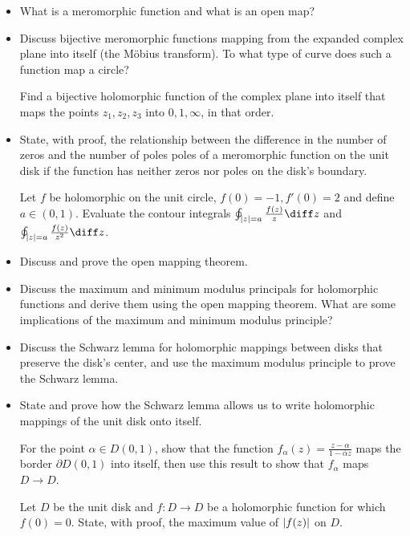 \begin{itemize}

	\item What is a meromorphic function and what is an open map?

	\item Discuss bijective meromorphic functions mapping from the expanded complex plane into itself (the M\"{o}bius transform). To what type of curve does such a function map a circle?
	
	Find a bijective holomorphic function of the complex plane into itself that maps the points $ z_1, z_{2}, z_{3} $ into $ 0, 1, \infty $, in that order.
	

	\item State, with proof, the relationship between the difference in the number of zeros and the number of poles poles of a meromorphic function on the unit disk if the function has neither zeros nor poles on the disk's boundary.
		
	Let $ f $ be holomorphic on the unit circle, $ f(0) = -1, f'(0) = 2 $ and define $ a \in (0, 1) $. Evaluate the contour integrals $ \oint_{\abs{z} = a} \frac{f(z)}{z} \diff z $ and  $ \oint_{\abs{z} = a} \frac{f(z)}{z^2} \diff z $. 

	
	\item Discuss and prove the open mapping theorem.
	
	\item Discuss the maximum and minimum modulus principals for holomorphic functions and derive them using the open mapping theorem. What are some implications of the maximum and minimum modulus principle?
	

	\item Discuss the Schwarz lemma for holomorphic mappings between disks that preserve the disk's center, and use the maximum modulus principle to prove the Schwarz lemma.
	
	\item State and  prove how the Schwarz lemma allows us to write holomorphic mappings of the unit disk onto itself.
	
	For the point $ \alpha \in D(0, 1) $, show that the function $ f_{\alpha}(z) = \frac{z - \alpha}{1 - \overline{\alpha}z} $ maps the border $ \partial D(0, 1) $ into itself, then use this result to show that $ f_{\alpha} $ maps $ D \to D $.
		
	Let $ D $ be the unit disk and $ f:D\to D $ be a holomorphic function for which $ f(0) = 0 $. State, with proof, the maximum value of $ \abs{f(z)} $ on $ D $.
		
\end{itemize}

